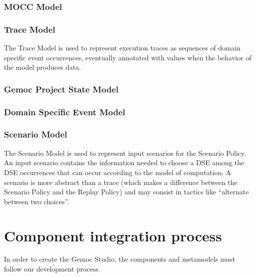\documentclass{gemoc} %
\begin{document}

\subsection{MOCC Model}


\subsection{Trace Model}
The Trace Model is used to represent execution traces as sequences of domain specific event occurrences, eventually annotated with values when the behavior of the model produces data.

\subsection{Gemoc Project State Model}


\subsection{Domain Specific Event Model}


\subsection{Scenario Model}
The Scenario Model is used to represent input scenarios for the Scenario Policy. An input scenario contains the information needed to choose a DSE among the DSE occurrences that can occur according to the model of computation. A scenario is more abstract than a trace (which makes a difference between the Scenario Policy and the Replay Policy) and may consist in tactics like ``alternate between two choices''.


\chapter{Component integration process}
In  order to create the Gemoc Studio, the components and metamodels must follow our development process.
\end{document}

